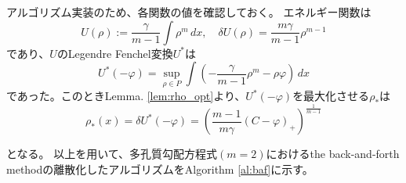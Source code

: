 アルゴリズム実装のため、各関数の値を確認しておく。
エネルギー関数は
\[
    U(\rho) := \frac{\gamma}{{m-1}} \int \rho^m \, dx, \quad \delta U(\rho) = \frac{m \gamma}{m-1} \rho^{m-1}
\]
であり、$U$のLegendre Fenchel変換$U^*$は
\[
     U^*(- \varphi) = \sup_{\rho \in P} \int \left(- \frac{\gamma}{m-1}\rho^m - \rho\varphi\right) \, dx
\]
であった。このときLemma. \ref{lem:rho_opt}より、$U^*(- \varphi)$を最大化させる$\rho_*$は
\begin{equation}
    \label{eq:m=2rho}
    \rho_*(x) = \delta U^*(- \varphi) =  \left( \frac{m-1}{m\gamma}(C - \varphi)_+ \right)^{\frac{1}{m-1}} 
\end{equation}

となる。
以上を用いて、多孔質勾配方程式$(m=2)$におけるthe back-and-forth methodの離散化したアルゴリズムをAlgorithm \ref{al:baf}に示す。

